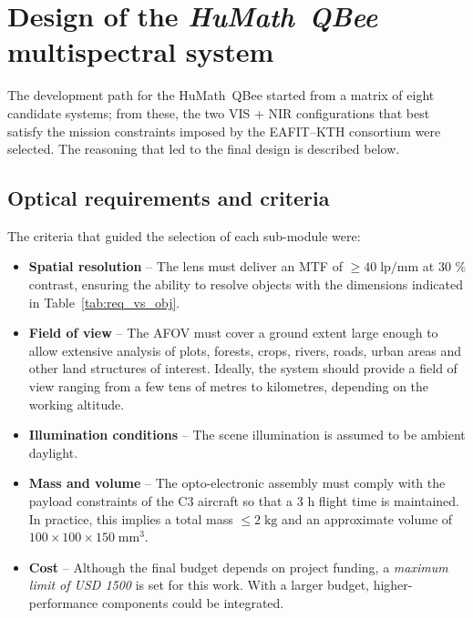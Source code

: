 \section{Design of the \textit{HuMath\textregistered\ QBee} multispectral system}

The development path for the HuMath\textregistered\ QBee started from a
matrix of eight candidate systems; from these, the two VIS + NIR
configurations that best satisfy the mission constraints imposed by the
EAFIT–KTH consortium were selected.  The reasoning that led to the final
design is described below.

\subsection{Optical requirements and criteria}

The criteria that guided the selection of each sub-module were:

\begin{itemize}
    \item \textbf{Spatial resolution} – The lens must deliver an
          MTF of \textbf{$\ge 40\;\text{lp/mm}$} at 30 \% contrast,
          ensuring the ability to resolve objects with the dimensions
          indicated in Table~\ref{tab:req_vs_obj}.
          
    \item \textbf{Field of view} – The AFOV must cover a ground extent
          large enough to allow extensive analysis of plots, forests,
          crops, rivers, roads, urban areas and other land structures of
          interest.  Ideally, the system should provide a field of view
          ranging from a few tens of metres to kilometres, depending on
          the working altitude.
    
    \item \textbf{Illumination conditions} – The scene illumination is
          assumed to be ambient daylight.
    
    \item \textbf{Mass and volume} – The opto-electronic assembly must
          comply with the payload constraints of the C3 aircraft so that
          a 3 h flight time is maintained.  In practice, this implies a
          total mass $\le 2\;\text{kg}$ and an approximate volume of
          $100\times100\times150\;\text{mm}^{3}$.
          
    \item \textbf{Cost} – Although the final budget depends on project
          funding, a \emph{maximum limit of USD 1500} is set for this
          work.  With a larger budget, higher-performance components
          could be integrated.
\end{itemize}

